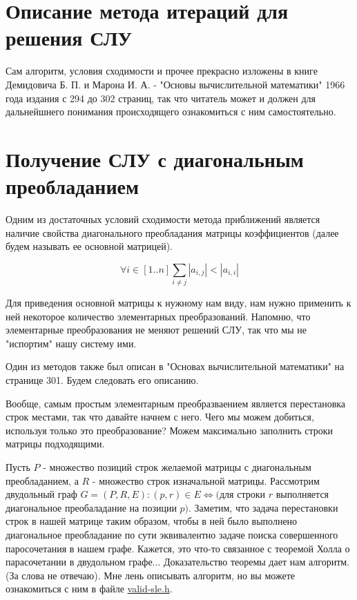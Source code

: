 \documentclass{article}
\begin{document}
\section{Описание метода итераций для решения СЛУ}
Сам алгоритм, условия сходимости и прочее прекрасно изложены
в книге Демидовича Б. П. и Марона И. А.
- "Основы вычислительной математики" 1966 года издания с
294 до 302 страниц, так что читатель может и должен для
дальнейшнего понимания происходящего ознакомиться с ним
самостоятельно.

\section{Получение СЛУ с диагональным преобладанием}
Одним из достаточных условий сходимости метода приближений является
наличие свойства диагонального преобладания матрицы коэффициентов
(далее будем называть ее основной матрицей).

\begin{equation}
    \forall i \in [1..n] \sum_{i \neq j} |a_{i, j}| < |a_{i,i}|
\end{equation}

Для приведения основной матрицы к нужному нам виду, нам
нужно применить к ней некоторое количество элементарных
преобразований. Напомню, что элементарные преобразования не
меняют решений СЛУ, так что мы не "испортим" нашу систему ими.

Один из методов также был описан в
"Основах вычислительной математики" на странице 301.
Будем следовать его описанию.

Вообще, самым простым элементарным преобразваением является
перестановка строк местами, так что давайте начнем с него.
Чего мы можем добиться, используя только это преобразование?
Можем максимально заполнить строки матрицы подходящими.

Пусть $P$ - множество позиций строк желаемой матрицы с
диагональным преобладанием, а $R$ - множество
строк изначальной матрицы.
Рассмотрим двудольный граф
$G = (P, R, E): (p, r) \in E \Leftrightarrow
    ($для строки $r$ выполняется диагональное
    преобаладание на позиции $p)
$. Заметим, что задача перестановки строк в нашей матрице таким
образом, чтобы в ней было выполнено диагональное преобладание по
сути эквивалентно задаче поиска совершенного паросочетания в
нашем графе. Кажется, это что-то связанное с теоремой Холла о
парасочетании в двудольном графе... Доказательство теоремы дает
нам алгоритм. (За слова не отвечаю). Мне лень описывать алгоритм,
но вы можете ознакомиться с ним в файле
\href{https://github.com/vityaman-edu/comp-math-systems-of-linear-equations/blob/trunk/src/math/sle/method/iteration/valid-sle.h#L39}{valid-sle.h}.
\end{document}
